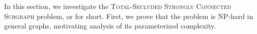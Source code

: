 \label{sec:scc}
In this section, we investigate the \textsc{Total-Secluded Strongly Connected Subgraph} problem, or \scs{} for short. First, we prove that the problem is NP-hard in general graphs, motivating analysis of its parameterized complexity.

	


